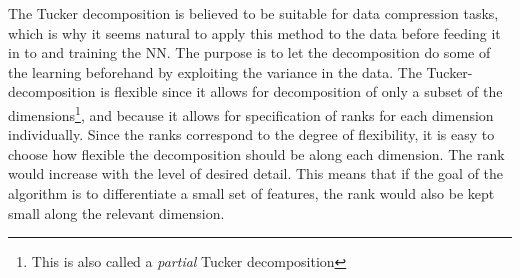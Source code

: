 The Tucker decomposition is believed to be suitable for data compression tasks\cite{Mørup2011}, which is why it seems natural to apply this method to the data before feeding it in to and training the NN. The purpose is to let the decomposition do some of the learning beforehand by exploiting the variance in the data. The Tucker-decomposition is flexible since it allows for decomposition of only a subset of the dimensions\footnote{This is also called a \textit{partial} Tucker decomposition}, and because it allows for specification of ranks for each dimension individually. Since the ranks correspond to the degree of flexibility, it is easy to choose how flexible the decomposition should be along each dimension. The rank would increase with the level of desired detail. This means that if the goal of the algorithm is to differentiate a small set of features, the rank would also be kept small along the relevant dimension.

